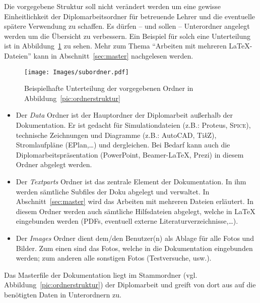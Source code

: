 \documentclass[12pt,paper=a4]{scrartcl}
\def\TikZ{Ti\textit{k}Z}
\begin{document}
Die vorgegebene Struktur soll nicht verändert werden um eine gewisse Einheitlichkeit der Diplomarbeitsordner
für betreuende Lehrer und die eventuelle spätere Verwendung zu schaffen. Es dürfen -- und sollen -- 
Unterordner angelegt werden um die Übersicht zu verbessern. Ein Beispiel für solch eine Unterteilung ist in
Abbildung~\ref{pic:unterordner} zu sehen. Mehr zum Thema "`{Arbeiten mit
mehreren \LaTeX{}-Dateien}"' kann in Abschnitt~\ref{sec:master} nachgelesen werden.\par\vspace{1mm}
\begin{figure}[H]
\centering
\texttt{[image: Images/subordner.pdf]}
\caption{Beispielhafte Unterteilung der vorgegebenen Ordner in Abbildung~\ref{pic:ordnerstruktur}}
\label{pic:unterordner}
\end{figure}

\def\labelitemi{$>$}
\begin{itemize}


\item Der \textit{Data} Ordner ist der Hauptordner der Diplomarbeit außerhalb der Dokumentation.
Er ist gedacht für Simulationdateien (z.B.: Proteus, {\scshape Spice}), technische Zeichnungen und
Diagramme (z.B.: AutoCAD, \TikZ), Stromlaufpläne (EPlan,\dots) und dergleichen. Bei Bedarf kann
auch die Diplomarbeitspräsentation (PowerPoint, Beamer-\LaTeX{}, Prezi) in diesem Ordner
abgelegt werden.

\item Der \textit{Textparts} Ordner ist das zentrale Element der Dokumentation. In ihm werden sämtliche
Subfiles der Doku abgelegt und verwaltet. In Abschnitt~\ref{sec:master} wird das Arbeiten mit
mehreren Dateien erläutert. In diesem Ordner werden auch sämtliche Hilfsdateien abgelegt, welche
in \LaTeX{} eingebunden werden (PDFs, eventuell externe Literaturverzeichnisse,\dots).

\item Der \textit{Images} Ordner dient dem/den Benutzer(n) als Ablage für alle Fotos und Bilder.
Zum einen sind das Fotos, welche in die Dokumentation eingebunden werden; zum anderen alle sonstigen Fotos
(Testversuche, usw.).

\end{itemize}\bigskip

Das Masterfile der Dokumentation liegt im Stammordner (vgl. Abbildung~\ref{pic:ordnerstruktur}) 
der Diplomarbeit und greift von dort aus auf die benötigten Daten in Unterordnern zu.\par\newpage
\end{document}
